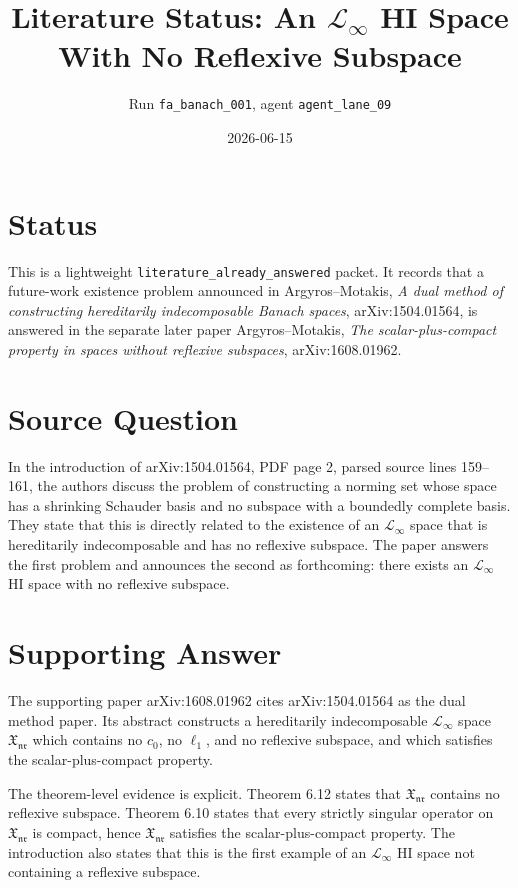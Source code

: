 \documentclass[11pt]{article}
\title{Literature Status: An \texorpdfstring{$\mathcal L_\infty$}{L-infinity} HI Space With No Reflexive Subspace}
\author{Run \texttt{fa\_banach\_001}, agent \texttt{agent\_lane\_09}}
\date{2026-06-15}
\begin{document}
\maketitle

\section*{Status}

This is a lightweight \texttt{literature\_already\_answered} packet. It records
that a future-work existence problem announced in Argyros--Motakis,
\emph{A dual method of constructing hereditarily indecomposable Banach spaces},
arXiv:1504.01564, is answered in the separate later paper
Argyros--Motakis, \emph{The scalar-plus-compact property in spaces without
reflexive subspaces}, arXiv:1608.01962.

\section*{Source Question}

In the introduction of arXiv:1504.01564, PDF page 2, parsed source lines
159--161, the authors discuss the problem of constructing a norming set whose
space has a shrinking Schauder basis and no subspace with a boundedly complete
basis. They state that this is directly related to the existence of an
$\mathcal L_\infty$ space that is hereditarily indecomposable and has no
reflexive subspace. The paper answers the first problem and announces the
second as forthcoming: there exists an $\mathcal L_\infty$ HI space with no
reflexive subspace.

\section*{Supporting Answer}

The supporting paper arXiv:1608.01962 cites arXiv:1504.01564 as the dual
method paper. Its abstract constructs a hereditarily indecomposable
$\mathcal L_\infty$ space $\mathfrak X_{\mathfrak{nr}}$ which contains no
$c_0$, no $\ell_1$, and no reflexive subspace, and which satisfies the
scalar-plus-compact property.

The theorem-level evidence is explicit. Theorem 6.12 states that
$\mathfrak X_{\mathfrak{nr}}$ contains no reflexive subspace. Theorem 6.10
states that every strictly singular operator on $\mathfrak X_{\mathfrak{nr}}$
is compact, hence $\mathfrak X_{\mathfrak{nr}}$ satisfies the
scalar-plus-compact property. The introduction also states that this is the
first example of an $\mathcal L_\infty$ HI space not containing a reflexive
subspace.
\end{document}
